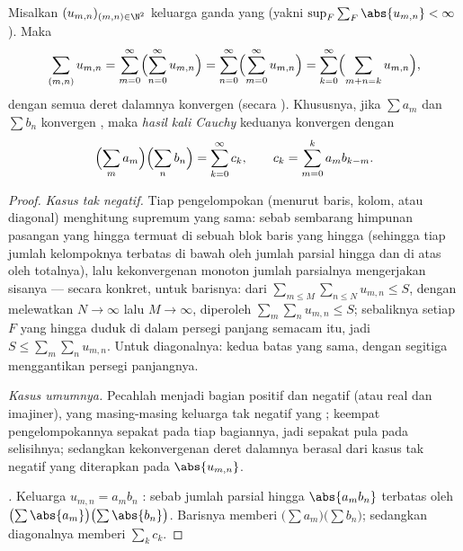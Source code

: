 \begin{theorem}\label{thm:b2:series:fubini}
Misalkan $(u_{m,n})_{(m,n) \in \N^2}$ keluarga ganda yang 
(yakni $\sup_F \sum_F \abs{u_{m,n}} < \infty$). Maka
\[
\sum_{(m,n)} u_{m,n}
= \sum_{m=0}^{\infty}\Bigl(\sum_{n=0}^{\infty} u_{m,n}\Bigr)
= \sum_{n=0}^{\infty}\Bigl(\sum_{m=0}^{\infty} u_{m,n}\Bigr)
= \sum_{k=0}^{\infty}\Bigl(\sum_{m+n=k} u_{m,n}\Bigr),
\]
dengan semua deret dalamnya konvergen (secara ). Khususnya, jika
$\sum a_m$ dan $\sum b_n$ konvergen , maka \emph{hasil kali
Cauchy} keduanya konvergen  dengan
\[
\Bigl(\sum_m a_m\Bigr)\Bigl(\sum_n b_n\Bigr)
= \sum_{k=0}^{\infty} c_k,
\qquad
c_k = \sum_{m=0}^{k} a_m b_{k-m} .
\]
\end{theorem}

\begin{proof}
\emph{Kasus tak negatif.} Tiap pengelompokan (menurut baris, kolom, atau
diagonal) menghitung supremum yang sama: sebab sembarang himpunan
pasangan yang hingga termuat di sebuah blok baris yang hingga (sehingga
tiap jumlah kelompoknya terbatas di bawah oleh jumlah parsial hingga dan
di atas oleh totalnya), lalu kekonvergenan monoton jumlah parsialnya
mengerjakan sisanya --- secara konkret, untuk barisnya: dari $\sum_{m
\leq M}\sum_{n \leq N} u_{m,n} \leq S$, dengan melewatkan $N \to \infty$
lalu $M \to \infty$, diperoleh $\sum_m \sum_n u_{m,n} \leq S$;
sebaliknya setiap $F$ yang hingga duduk di dalam persegi panjang
semacam itu, jadi $S \leq \sum_m\sum_n u_{m,n}$. Untuk diagonalnya:
kedua batas yang sama, dengan segitiga menggantikan persegi panjangnya.

\emph{Kasus umumnya.} Pecahlah menjadi bagian positif dan negatif (atau
real dan imajiner), yang masing-masing keluarga tak negatif yang
; keempat pengelompokannya sepakat pada tiap bagiannya, jadi
sepakat pula pada selisihnya; sedangkan kekonvergenan  deret
dalamnya berasal dari kasus tak negatif yang diterapkan pada
$\abs{u_{m,n}}$.

\emph{.} Keluarga $u_{m,n} = a_m b_n$ :
sebab jumlah parsial hingga $\abs{a_mb_n}$ terbatas oleh
$\bigl(\sum\abs{a_m}\bigr)\bigl(\sum\abs{b_n}\bigr)$. Barisnya memberi
$\bigl(\sum a_m\bigr)\bigl(\sum b_n\bigr)$; sedangkan diagonalnya
memberi $\sum_k c_k$.
\end{proof}

